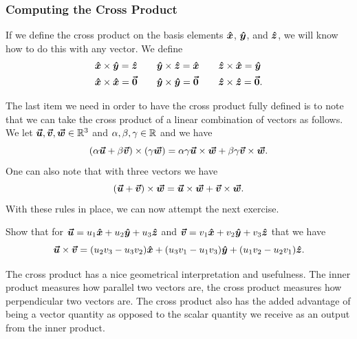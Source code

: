         \subsubsection{Computing the Cross Product}
        If we define the cross product on the basis elements $\xhat$, $\yhat$, and $\zhat$, we will know how to do this with any vector.  We define
        \begin{align*}
            &\xhat\times \yhat = \zhat &\quad &\yhat\times \zhat = \xhat &\quad
            &\zhat\times \xhat = \yhat\\
            &\xhat\times \xhat = \zerovec &\quad
            &\yhat\times \yhat = \zerovec &\quad
            &\zhat\times \zhat = \zerovec.
        \end{align*}
        
        The last item we need in order to have the cross product fully defined is to note that we can take the cross product of a linear combination of vectors as follows. We let $\vecu,\vecv,\vecw \in \R^3$ and $\alpha,\beta,\gamma \in \R$ and we have
        \[
        (\alpha \vecu + \beta \vecv)\times (\gamma \vecw) = \alpha \gamma \vecu \times \vecw + \beta \gamma  \vecv \times \vecw.
        \]
        One can also note that with three vectors we have
        \[
        (\vecu + \vecv)\times \vecw = \vecu \times \vecw + \vecv \times \vecw.
        \]
        With these rules in place, we can now attempt the next exercise.
        
        \begin{exercise}
        Show that for $\vecu = u_1 \xhat + u_2\yhat + u_3 \zhat$ and $\vecv = v_1 \xhat + v_2 \yhat + v_3\zhat$ that we have
        \[
        \vecu\times \vecv = (u_2 v_3-u_3 v_2)\xhat + (u_3 v_1-u_1 v_3)\yhat+ (u_1 v_2 - u_2 v_1)\zhat.
        \]
        \end{exercise}
        
        The cross product has a nice geometrical interpretation and usefulness.  The inner product measures how parallel two vectors are, the cross product measures how perpendicular two vectors are.  The cross product also has the added advantage of being a vector quantity as opposed to the scalar quantity we receive as an output from the inner product.
        
